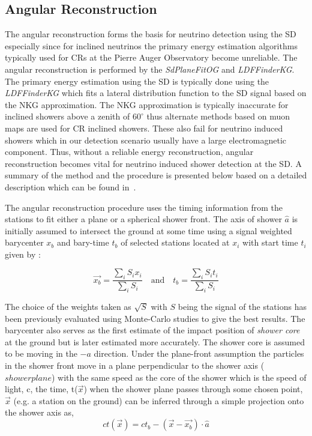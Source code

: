 \subsection{Angular Reconstruction}
\label{subsec:angular_reco}

The angular reconstruction forms the basis for neutrino detection using the SD especially since for inclined neutrinos the primary energy estimation algorithms typically used for CRs at the Pierre Auger Observatory become unreliable. The angular reconstruction is performed by the \textit{SdPlaneFitOG} and \textit{LDFFinderKG}. The primary energy estimation using the SD is typically done using the \textit{LDFFinderKG} which fits a lateral distribution function to the SD signal based on the NKG approximation. The NKG approximation is typically inaccurate for inclined showers above a zenith of $60^{\circ}$ thus alternate methods based on muon maps are used for CR inclined showers. These also fail for neutrino induced showers which in our detection scenario usually have a large electromagnetic component. Thus, without a reliable energy reconstruction, angular reconstruction becomes vital for neutrino induced shower detection at the SD. A summary of the method and the procedure is presented below based on a detailed description which can be found in~\cite{PierreAuger:2020yab}. 

The angular reconstruction procedure uses the timing information from the stations to fit either a plane or a spherical shower front. The axis of shower $\hat{a}$ is initially assumed to intersect the ground at some time using a signal weighted barycenter $x_b$ and bary-time $t_b$ of selected stations located at $x_i$ with start time $t_i$ given by :

\begin{equation}
  \vec{x_b} = \frac{\sum_{i} S_i x_i}{\sum_{i} S_i} \quad \text{and} \quad t_b = \frac{\sum_{i} S_i t_i}{\sum_{i} S_i}
\end{equation}

The choice of the weights taken as $\sqrt{S} $ with $S$ being the signal of the stations has been previously evaluated using Monte-Carlo studies to give the best results. The barycenter also serves as the first estimate of the impact position of \textit{shower core} at the ground but is later estimated more accurately. The shower core is assumed to be moving in the $-a$ direction. Under the plane-front assumption the particles in the shower front move in a plane perpendicular to the shower axis ($shower plane$) with the same speed as the core of the shower which is the speed of light, c, the time, t($\vec{x}$) when the shower plane passes through some chosen point, $\vec{x}$ (e.g. a station on the ground) can be inferred through a simple projection onto the shower axis as,
\begin{equation}
  ct(\vec{x}) = ct_b - (\vec{x}-\vec{x_b})\cdot \hat{a}
\end{equation}

